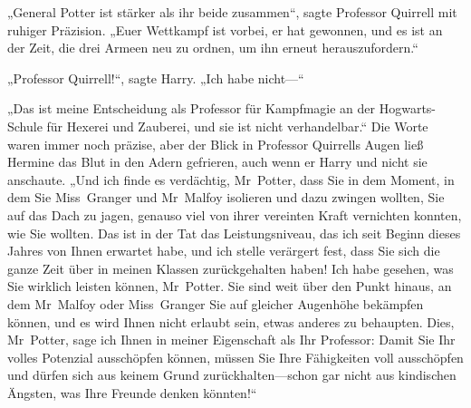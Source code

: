 „General Potter ist stärker als ihr beide zusammen“, sagte Professor Quirrell mit ruhiger Präzision. „Euer Wettkampf ist vorbei, er hat gewonnen, und es ist an der Zeit, die drei Armeen neu zu ordnen, um ihn erneut herauszufordern.“

„Professor Quirrell!“, sagte Harry. „Ich habe nicht—“

„Das ist meine Entscheidung als Professor für Kampfmagie an der Hogwarts-Schule für Hexerei und Zauberei, und sie ist nicht verhandelbar.“ Die Worte waren immer noch präzise, aber der Blick in Professor Quirrells Augen ließ Hermine das Blut in den Adern gefrieren, auch wenn er Harry und nicht sie anschaute. „Und ich finde es verdächtig, Mr~Potter, dass Sie in dem Moment, in dem Sie Miss~Granger und Mr~Malfoy isolieren und dazu zwingen wollten, Sie auf das Dach zu jagen, genauso viel von ihrer vereinten Kraft vernichten konnten, wie Sie wollten. Das ist in der Tat das Leistungsniveau, das ich seit Beginn dieses Jahres von Ihnen erwartet habe, und ich stelle verärgert fest, dass Sie sich die ganze Zeit über in meinen Klassen zurückgehalten haben! Ich habe gesehen, was Sie wirklich leisten können, Mr~Potter. Sie sind weit über den Punkt hinaus, an dem Mr~Malfoy oder Miss~Granger Sie auf gleicher Augenhöhe bekämpfen können, und es wird Ihnen nicht erlaubt sein, etwas anderes zu behaupten. Dies, Mr~Potter, sage ich Ihnen in meiner Eigenschaft als Ihr Professor: Damit Sie Ihr volles Potenzial ausschöpfen können, müssen Sie Ihre Fähigkeiten voll ausschöpfen und dürfen sich aus keinem Grund zurückhalten—schon gar nicht aus kindischen Ängsten, was Ihre Freunde denken könnten!“


